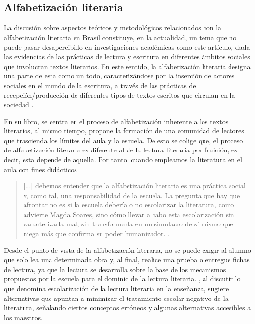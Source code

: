 \documentclass[spanish]{textolivre}
\begin{document}
\subsection{Alfabetización literaria}\label{sec-literaria}
La discusión sobre aspectos teóricos y metodológicos relacionados con la alfabetización literaria en Brasil constituye, en la actualidad, un tema que no puede pasar desapercibido en investigaciones académicas como este artículo, dada las evidencias de las prácticas de lectura y escritura en diferentes ámbitos sociales que involucran textos literarios. En este sentido, la alfabetización literaria designa una parte de esta como un todo, caracterizándose por la inserción de actores sociales en el mundo de la escritura, a través de las prácticas de recepción/producción de diferentes tipos de textos escritos que circulan en la sociedad \cite{paulino_letramento_2001}. 

En su libro, \textcite{cosson_letramento_2009} se centra en el proceso de alfabetización inherente a los textos literarios, al mismo tiempo, propone la formación de una comunidad de lectores que trascienda los límites del aula y la escuela. De esto se colige que, el proceso de alfabetización literaria es diferente al de la lectura literaria por fruición; es decir, esta depende de aquella. Por tanto, cuando empleamos la literatura en el aula con fines didácticos

\begin{quote}
    [...] debemos entender que la alfabetización literaria es una práctica social y, como tal, una responsabilidad de la escuela. La pregunta que hay que afrontar no es si la escuela debería o no escolarizar la literatura, como advierte Magda Soares, sino cómo llevar a cabo esta escolarización sin caracterizarla mal, sin transformarla en un simulacro de sí mismo que niega más que confirma su poder humanizador. \cite[p. 23]{cosson_letramento_2009}. 
\end{quote}

Desde el punto de vista de la alfabetización literaria, no se puede exigir al alumno que solo lea una determinada obra y, al final, realice una prueba o entregue fichas de lectura, ya que la lectura se desarrolla sobre la base de los mecanismos propuestos por la escuela para el dominio de la lectura literaria. \textcite{cosson_letramento_2009}, al discutir lo que denomina escolarización de la lectura literaria en la enseñanza, sugiere alternativas que apuntan a minimizar el tratamiento escolar negativo de la literatura, señalando ciertos conceptos erróneos y algunas alternativas accesibles a los maestros. 
\end{document}
